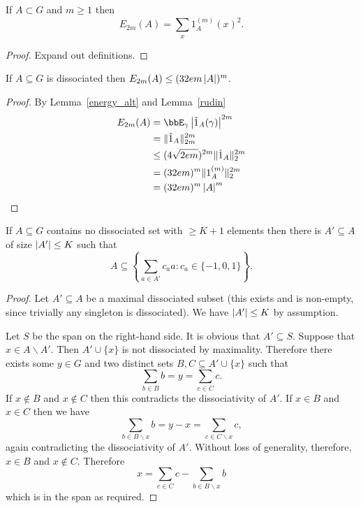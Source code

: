 \begin{lemma}
\label{energy_alt}
\leanok
If $A\subset G$ and $m\geq 1$ then
\[E_{2m}(A) = \sum_x 1_A^{(m)}(x)^2.\]
\end{lemma}

\begin{proof}
\leanok
Expand out definitions.
\end{proof}


\begin{lemma}
\label{diss_energy}
\leanok
If $A\subseteq G$ is dissociated then $E_{2m}(A) \leq (32e m \left\lvert A\right\rvert)^m$.
\end{lemma}
\begin{proof}
\leanok
By Lemma~\ref{energy_alt} and Lemma~\ref{rudin}
\begin{align*}
  E_{2m}(A)
  & = \bbE_\gamma \abs{\hat 1_A(\gamma)}^{2m} \\
  & = \norm{\hat 1_A}_{2m}^{2m} \\
  & \le (4\sqrt{2em})^{2m} \norm{\hat 1_A}_2^{2m} \\
  & = (32em)^m \norm{1_A^{(m)}}_2^{2m} \\
  & = (32em)^m \abs{A}^m
\end{align*}
\end{proof}


\begin{lemma}
\label{diss_span}
\leanok
If $A\subseteq G$ contains no dissociated set with $\geq K+1$ elements then there is $A'\subseteq A$ of size $\left\lvert A'\right\rvert\leq K$ such that
\[A\subseteq \left\{ \sum_{a\in A'}c_aa : c_a\in \{-1,0,1\} \right\}.\]
\end{lemma}

\begin{proof}
\leanok
Let $A'\subseteq A$ be a maximal dissociated subset (this exists and is non-empty, since trivially any singleton is dissociated). We have $\left\lvert A'\right\rvert\leq K$ by assumption.

Let $S$ be the span on the right-hand side. It is obvious that $A'\subseteq S$. Suppose that $x\in A\backslash A'$. Then $A'\cup\{x\}$ is not dissociated by maximality. Therefore there exists some $y\in G$ and two distinct sets $B,C\subseteq A'\cup \{x\}$ such that
\[\sum_{b\in B}b = y = \sum_{c\in C} c.\]
If $x\not\in B$ and $x\not\in C$ then this contradicts the dissociativity of $A'$. If $x\in B$ and $x\in C$ then we have
\[\sum_{b\in B\backslash x}b=y-x=\sum_{c\in C\backslash x}c,\]
again contradicting the dissociativity of $A'$. Without loss of generality, therefore, $x\in B$ and $x\not\in C$. Therefore
\[x=\sum_{c\in C}c - \sum_{b\in B\backslash x}b\]
which is in the span as required.
\end{proof}


